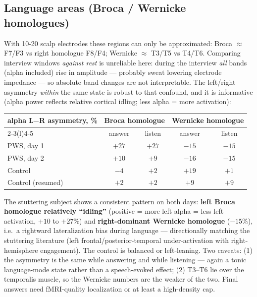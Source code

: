 \documentclass[11pt,a4paper]{article}
\begin{document}
\subsection*{Language areas (Broca / Wernicke homologues)}
With 10-20 scalp electrodes these regions can only be approximated: Broca $\approx$ F7/F3 vs right
homologue F8/F4; Wernicke $\approx$ T3/T5 vs T4/T6. Comparing interview windows \emph{against rest}
is unreliable here: during the interview \emph{all} bands (alpha included) rise in amplitude ---
probably sweat lowering electrode impedance --- so absolute band changes are not interpretable.
The left/right asymmetry \emph{within} the same state is robust to that confound, and it is
informative (alpha power reflects relative cortical idling; less alpha = more activation):
\begin{center}\small
\begin{tabular}{@{}lcccc@{}}
\toprule
alpha L$-$R asymmetry, \% & \multicolumn{2}{c}{Broca homologue} & \multicolumn{2}{c}{Wernicke homologue} \\
\cmidrule(r){2-3}\cmidrule(l){4-5}
& answer & listen & answer & listen \\
\midrule
PWS, day 1 & $+27$ & $+27$ & $-15$ & $-15$ \\
PWS, day 2 & $+10$ & $+9$ & $-16$ & $-15$ \\
Control & $-4$ & $+2$ & $+19$ & $+1$ \\
Control (resumed) & $+2$ & $+2$ & $+9$ & $+9$ \\
\bottomrule
\end{tabular}
\end{center}
The stuttering subject shows a consistent pattern on both days: \textbf{left Broca homologue
relatively ``idling''} (positive = more left alpha = less left activation, $+10$ to $+27\%$) and
\textbf{right-dominant Wernicke homologue} ($-15\%$), i.e.\ a rightward lateralization bias during
language --- directionally matching the stuttering literature (left frontal/posterior-temporal
under-activation with right-hemisphere engagement). The control is balanced or left-leaning.
Two caveats: (1) the asymmetry is the same while answering and while listening --- again a tonic
language-mode state rather than a speech-evoked effect; (2) T3--T6 lie over the temporalis muscle,
so the Wernicke numbers are the weaker of the two. Final answers need fMRI-quality localization or
at least a high-density cap.
\end{document}
